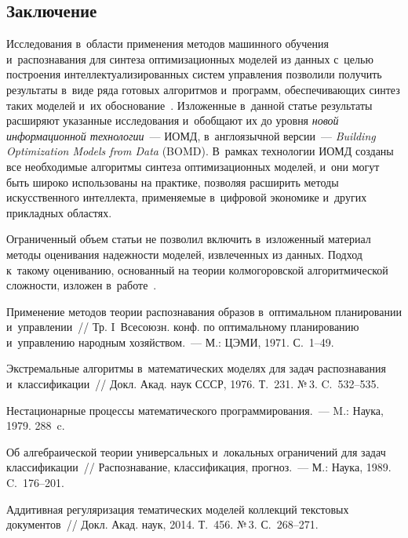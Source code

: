 \begin{multicols}{2}
\section{Заключение}

Исследования в~области применения методов машинного обучения и~распознавания 
для синтеза оптимизационных моделей из данных с~целью построения 
интеллектуализированных сис\-тем управ\-ле\-ния  позволили получить 
результаты в~виде ряда готовых алгоритмов и~программ, 
обеспечивающих синтез таких моделей и~их обоснование~\cite{6-don, 7-don, 8-don}. 
Изложенные в~данной статье результаты расширяют указанные 
исследования и~обобщают их до уровня 
\textit{новой информационной технологии}~--- 
ИОМД, в~англоязычной 
версии~--- \textit{Building Optimization Models from Data} (BOMD). 
В~рамках технологии ИОМД созданы все необходимые алгоритмы синтеза 
оптимизационных моделей, и~они могут быть широко использованы на 
практике, позволяя расширить  методы искусственного интеллекта, 
применяемые в~цифровой экономике и~других прикладных областях.

Ограниченный объем статьи не позволил включить 
в~изложенный материал методы оценивания надежности моделей, 
извлеченных из данных. Подход к~такому оцениванию, основанный 
на теории колмогоровской алгоритмической сложности, изложен 
в~работе~\cite{6-don}.

{\small\frenchspacing
 {%
 \begin{thebibliography}{99}


 Применение методов теории распознавания 
образов в~оптимальном планировании и~управ\-ле\-нии~// Тр. I~Всесоюзн. 
конф. по оптимальному планированию и~управ\-ле\-нию народным хозяйством.~--- 
М.: ЦЭМИ, 1971. С.~1--49.

Экстремальные алгоритмы в~математических моделях для задач 
распознавания и~классификации~// Докл. Акад. наук СССР, 1976. Т.~231. №\,3. 
C.~532--535.

Нестационарные процессы математического программирования.~--- M.: Наука, 1979. 288~c.

 Об алгебраической теории универсальных и~локальных 
ограничений для задач классификации~// Распознавание, классификация, 
прогноз.~--- М.: Наука, 1989. C.~176--201.

 Аддитивная регуляризация тематических моделей 
коллекций текстовых документов~// Докл. Акад. наук, 2014. Т.~456. №\,3. С.~268--271.


\end{thebibliography}}}
\end{multicols}
